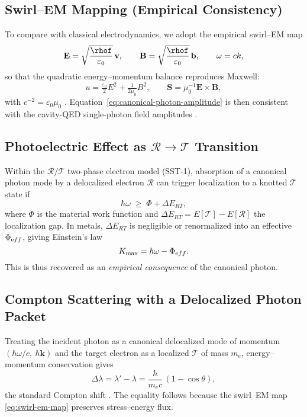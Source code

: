\documentclass[11pt,a4paper]{article}
\begin{document}
    \subsection{Swirl--EM Mapping (Empirical Consistency)}
    To compare with classical electrodynamics, we adopt the
    empirical swirl--EM map
    \begin{equation}
    \mathbf{E}=\sqrt{\frac{\rhof}{\varepsilon_0}}\,\mathbf{v},\qquad
    \mathbf{B}=\sqrt{\frac{\rhof}{\varepsilon_0}}\,\mathbf{b},\qquad
    \omega=ck,
    \label{eq:swirl-em-map}
    \end{equation}
    so that the quadratic energy--momentum balance reproduces Maxwell:
    \[
    u=\tfrac{\varepsilon_0}{2}E^2+\tfrac{1}{2\mu_0}B^2,\qquad
    \mathbf{S}=\mu_0^{-1}\mathbf{E}\!\times\!\mathbf{B},
    \]
    with $c^{-2}=\varepsilon_0\mu_0$ \cite{Jackson1999}.
    Equation~\eqref{eq:canonical-photon-amplitude} is then consistent with the
    cavity-QED single-photon field amplitudes \cite{HarocheRaimond2006,ScullyZubairy1997}.

    \subsection{Photoelectric Effect as $\mathcal R\!\to\!\mathcal T$ Transition}
    Within the $\mathcal R/\mathcal T$ two-phase electron model (SST-1),
    absorption of a canonical photon mode by a delocalized electron $\mathcal R$
    can trigger localization to a knotted $\mathcal T$ state if
    \begin{equation}
    \hbar\omega \;\ge\; \Phi + \Delta E_{RT},
    \end{equation}
    where $\Phi$ is the material work function and
    $\Delta E_{RT}=E[\mathcal T]-E[\mathcal R]$ the localization gap.
    In metals, $\Delta E_{RT}$ is negligible or renormalized into
    an effective $\Phi_{\textrm eff}$, giving Einstein’s law
    \begin{equation}
    K_{\max}=\hbar\omega-\Phi_{\textrm eff}.
    \end{equation}
    This is thus recovered as an \emph{empirical consequence} of the canonical photon.

    \subsection{Compton Scattering with a Delocalized Photon Packet}
    Treating the incident photon as a canonical delocalized mode of momentum
    $(\hbar\omega/c,\ \hbar\mathbf{k})$ and the target electron as a localized $\mathcal T$
    of mass $m_e$, energy--momentum conservation gives
    \begin{equation}
    \Delta\lambda=\lambda'-\lambda=\frac{h}{m_e c}\,(1-\cos\theta),
    \end{equation}
    the standard Compton shift \cite{Compton1923}.
    The equality follows because the swirl--EM map
    \eqref{eq:swirl-em-map} preserves stress--energy flux.
\end{document}

